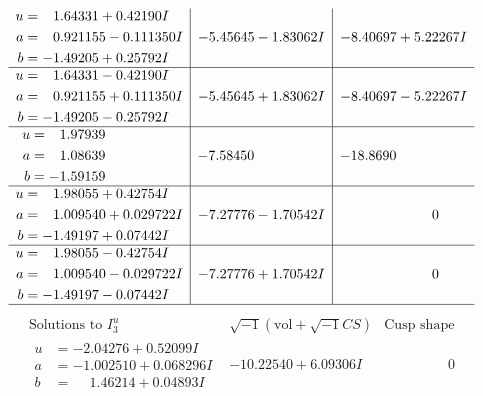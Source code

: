 \documentclass[1p]{elsarticle_modified}
\theoremstyle{definition}
\newcommand{\I}{\sqrt{-1}}
\begin{document}
$$\begin{array}{c|c|c}
\begin{aligned}
u &= \phantom{-}1.64331 + 0.42190 I \\
a &= \phantom{-}0.921155 - 0.111350 I \\
b &= -1.49205 + 0.25792 I\end{aligned}
 & -5.45645 - 1.83062 I & -8.40697 + 5.22267 I \\ \hline\begin{aligned}
u &= \phantom{-}1.64331 - 0.42190 I \\
a &= \phantom{-}0.921155 + 0.111350 I \\
b &= -1.49205 - 0.25792 I\end{aligned}
 & -5.45645 + 1.83062 I & -8.40697 - 5.22267 I \\ \hline\begin{aligned}
u &= \phantom{-}1.97939\phantom{ +0.000000I} \\
a &= \phantom{-}1.08639\phantom{ +0.000000I} \\
b &= -1.59159\phantom{ +0.000000I}\end{aligned}
 & -7.58450\phantom{ +0.000000I} & -18.8690\phantom{ +0.000000I} \\ \hline\begin{aligned}
u &= \phantom{-}1.98055 + 0.42754 I \\
a &= \phantom{-}1.009540 + 0.029722 I \\
b &= -1.49197 + 0.07442 I\end{aligned}
 & -7.27776 - 1.70542 I & \phantom{-0.000000 } 0 \\ \hline\begin{aligned}
u &= \phantom{-}1.98055 - 0.42754 I \\
a &= \phantom{-}1.009540 - 0.029722 I \\
b &= -1.49197 - 0.07442 I\end{aligned}
 & -7.27776 + 1.70542 I & \phantom{-0.000000 } 0\\
 \hline 
 \end{array}$$\newpage$$\begin{array}{c|c|c}  
\text{Solutions to }I^u_{3}& \I (\text{vol} + \sqrt{-1}CS) & \text{Cusp shape}\\
 \hline 
\begin{aligned}
u &= -2.04276 + 0.52099 I \\
a &= -1.002510 + 0.068296 I \\
b &= \phantom{-}1.46214 + 0.04893 I\end{aligned}
 & -10.22540 + 6.09306 I & \phantom{-0.000000 } 0 \\ \hline\begin{aligned}

\end{aligned}
\end{array}$$
\end{document}
